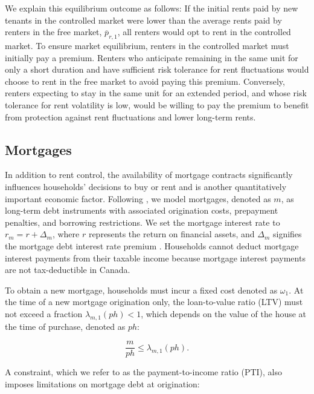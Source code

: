 \documentclass[parskip=full]{article}
\begin{document}
We explain this equilibrium outcome as follows: If the initial rents paid by new tenants in the controlled market were lower than the average rents paid by renters in the free market, $\overline{p}_{r,1}$, all renters would opt to rent in the controlled market. To ensure market equilibrium, renters in the controlled market must initially pay a premium. Renters who anticipate remaining in the same unit for only a short duration and have sufficient risk tolerance for rent fluctuations would choose to rent in the free market to avoid paying this premium. Conversely, renters expecting to stay in the same unit for an extended period, and whose risk tolerance for rent volatility is low, would be willing to pay the premium to benefit from protection against rent fluctuations and lower long-term rents.

\subsection{Mortgages}\label{subsection:morgtages}

In addition to rent control, the availability of mortgage contracts significantly influences households' decisions to buy or rent and is another quantitatively important economic factor. Following \citet{kkk-2021}, we model mortgages, denoted as $m$, as long-term debt instruments with associated origination costs, prepayment penalties, and borrowing restrictions. We set the mortgage interest rate to $r_{m}=r+\Delta_m$, where $r$ represents the return on financial assets, and $\Delta_m$ signifies the mortgage debt interest rate premium \citep{sommeretal-2013,sommersullivan-2017,kaplanetal-2019}. Households cannot deduct mortgage interest payments from their taxable income because mortgage interest payments are not tax-deductible in Canada.

To obtain a new mortgage, households must incur a fixed cost denoted as $\omega_{1}$. At the time of a new mortgage origination only, the loan-to-value ratio (LTV) must not exceed a fraction $\lambda_{m,1}(ph)<1$, which depends on the value of the house at the time of purchase, denoted as $ph$:

\begin{equation}\label{eq:LTV}
\frac{m}{p h} \leq \lambda_{m,1}(ph).
\end{equation}

\noindent A constraint, which we refer to as the payment-to-income ratio (PTI), also imposes limitations on mortgage debt at origination:
\end{document}
